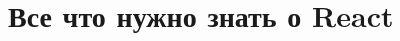 \documentclass[12pt]{report}
\begin{document}

\chapter{Все что нужно знать о React}




\end{document}
